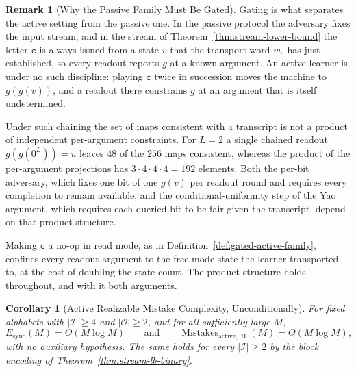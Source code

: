 \documentclass[12pt]{article}
\newtheorem{corollary}[theorem]{Corollary}
\theoremstyle{definition}
\newtheorem{remark}[theorem]{Remark}
\newcommand{\Esync}{E_{\mathrm{sync}}}
\newcommand{\MistRI}{\operatorname{Mistakes}_{\mathrm{active,RI}}}
\begin{document}
\begin{remark}[Why the Passive Family Must Be Gated]
\label{rem:gating-needed}
Gating is what separates the active setting from the passive one.  In the
passive protocol the adversary fixes the input stream, and in the stream of
Theorem~\ref{thm:stream-lower-bound} the letter $\mathtt c$ is always issued
from a state $v$ that the transport word $w_v$ has just established, so every
readout reports $g$ at a known argument.  An active learner is under no such
discipline: playing $\mathtt c$ twice in succession moves the machine to
$g(g(v))$, and a readout there constrains $g$ at an argument that is itself
undetermined.

Under such chaining the set of maps consistent with a transcript is not a
product of independent per-argument constraints.  For $L=2$ a single chained
readout $g(g(0^L))=u$ leaves $48$ of the $256$ maps consistent, whereas the
product of the per-argument projections has $3\cdot4\cdot4\cdot4=192$
elements.  Both the per-bit adversary, which fixes one bit of one $g(v)$ per
readout round and requires every completion to remain available, and the
conditional-uniformity step of the Yao argument, which requires each queried
bit to be fair given the transcript, depend on that product structure.

Making $\mathtt c$ a no-op in read mode, as in
Definition~\ref{def:gated-active-family}, confines every readout argument to
the free-mode state the learner transported to, at the cost of doubling the
state count.  The product structure holds throughout, and with it both
arguments.
\end{remark}

\begin{corollary}[Active Realizable Mistake Complexity, Unconditionally]
\label{cor:active-theta}
For fixed alphabets with $|\mathcal I|\ge4$ and $|\mathcal O|\ge2$, and for
\emph{all} sufficiently large $M$,
\[
\Esync(M)=\Theta(M\log M)
\qquad\text{and}\qquad
\MistRI(M)=\Theta(M\log M),
\]
with no auxiliary hypothesis.  The same holds for every
$|\mathcal I|\ge2$ by the block encoding of
Theorem~\ref{thm:stream-lb-binary}.
\end{corollary}
\end{document}
